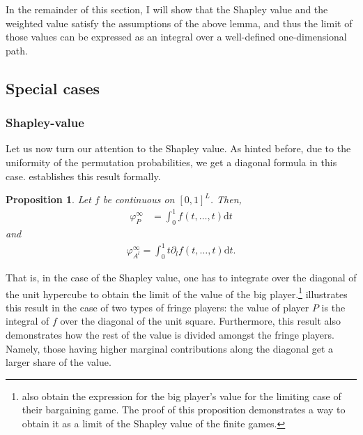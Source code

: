 \documentclass[a4paper]{article}
\newtheorem{proposition}{Proposition}
\newcommand{\dt}{\mathrm{d}t}
\begin{document}
In the remainder of this section, I will show that the Shapley value and the weighted value satisfy the assumptions of the above lemma, and thus the limit of those values can be expressed as an integral over a well-defined one-dimensional path.


\subsection{Special cases}
\subsubsection{Shapley-value}

Let us now turn our attention to the Shapley value.
As hinted before, due to the uniformity of the permutation probabilities, we get a diagonal formula in this case.
 establishes this result formally.

\begin{proposition}
    \label{prop:many_sided_shapley}
    Let $f$ be continuous on $[0, 1]^L$.
    Then,
    \begin{align*}
        \varphi_P^\infty & = \int_0^1 f(t, \dots, t) \dt
    \end{align*}
    and
    \begin{align*}
        \varphi_{A^l}^\infty = \int_0^1 t \partial_l f(t, \dots, t) \dt.
    \end{align*}
\end{proposition}
That is, in the case of the Shapley value, one has to integrate over the diagonal of the unit hypercube to obtain the limit of the value of the big player.\footnote{
    \textcite{stole1996intra} also obtain the expression for the big player's value for the limiting case of their bargaining game.
    The proof of this proposition demonstrates a way to obtain it as a limit of the Shapley value of the finite games.
}
 illustrates this result in the case of two types of fringe players: the value of player $P$ is the integral of $f$ over the diagonal of the unit square.
Furthermore, this result also demonstrates how the rest of the value is divided amongst the fringe players.
Namely, those having higher marginal contributions along the diagonal get a larger share of the value.
\end{document}
